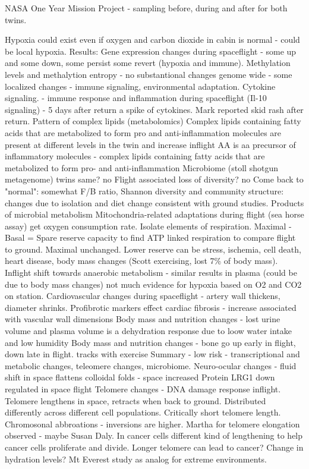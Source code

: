 \documentclass[a4paper, 11pt]{article}
\begin{document}
    NASA One Year Mission Project - sampling before, during and after for both twins. 
    
    Hypoxia could exist even if oxygen and carbon dioxide in cabin is normal - could be local hypoxia. 
    Results: Gene expression changes during spaceflight - some up and some down, some persist some revert (hypoxia and immune). Methylation levels and methalytion entropy - no substantional changes genome wide - some localized changes - immune signaling, environmental adaptation. 
    Cytokine signaling. - immune response and inflammation during spaceflight (Il-10 signaling)   - 5 days after return a spike of cytokines. Mark reported skid rash after return. 
    Pattern of complex lipids (metabolomics) Complex lipids containing fatty acids that are metabolized to form pro and anti-inflammation molecules are present at different levels in the twin and increase inflight 
    AA is aa precursor of inflammatory molecules - complex lipids containing fatty acids that are metabolized to form pro- and anti-inflammation
    Microbiome (stoll shotgun metagenome) twins same? no Flight associated loss of diversity? no Come back to "normal": somewhat 
    F/B ratio, Shannon diversity and community structure: changes due to isolation and diet change consistent with ground studies. 
    Products of microbial metabolism 
    Mitochondria-related adaptations during flight (sea horse assay) get oxygen consumption rate. Isolate elements of respiration. Maximal - Basal = Spare reserve capacity to find ATP linked respiration  to compare flight to ground.  Maximal unchanged. Lower reserve can be stress, ischemia, cell death, heart disease, body mass changes (Scott exercising, lost 7\% of body mass). 
    Inflight shift towards anaerobic metabolism - similar results in plasma (could be due to body mass changes) not much evidence for hypoxia based on O2 and CO2 on station. 
    Cardiovascular changes during spaceflight - artery wall thickens, diameter shrinks. Profibrotic markers effect cardiac fibrosis - increase associated with vascular wall dimensions
    Body mass and nutrition changes - lost urine volume and plasma volume is a dehydration response due to loow water intake and low humidity
    Body mass and nutrition changes - bone go up early in flight, down late in flight. tracks with exercise
    Summary - low risk - transcriptional and metabolic changes, teleomere changes, microbiome. 
    Neuro-ocular changes - fluid shift in space flattens colloidal folds - space increased Protein LRG1 down regulated in space flight 
    Telomere changes - DNA damage response inflight. Telomere lengthens in space, retracts when back to ground. Distributed differently across different cell populations. Critically short telomere length. Chromosonal abbroations - inversions are higher. Martha for telomere elongation observed - maybe Susan Daly. In cancer cells different kind of lengthening to help cancer cells proliferate and divide. Longer telomere  can lead to cancer?
    Change in hydration levels? Mt Everest study as analog for extreme environments. 
    
\end{document}
